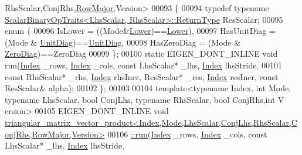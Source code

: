 \begin{DoxyCode}
      RhsScalar,ConjRhs,\hyperlink{group__enums_ggaacded1a18ae58b0f554751f6cdf9eb13acfcde9cd8677c5f7caf6bd603666aae3}{RowMajor},Version>
00093 \{
00094   \textcolor{keyword}{typedef} \textcolor{keyword}{typename} \hyperlink{group___core___module_struct_eigen_1_1_scalar_binary_op_traits}{ScalarBinaryOpTraits<LhsScalar, RhsScalar>::ReturnType}
       ResScalar;
00095   \textcolor{keyword}{enum} \{
00096     IsLower = ((Mode&\hyperlink{group__enums_gga39e3366ff5554d731e7dc8bb642f83cda891792b8ed394f7607ab16dd716f60e6}{Lower})==\hyperlink{group__enums_gga39e3366ff5554d731e7dc8bb642f83cda891792b8ed394f7607ab16dd716f60e6}{Lower}),
00097     HasUnitDiag = (Mode & \hyperlink{group__enums_gga39e3366ff5554d731e7dc8bb642f83cdaddb72f888ac85d5a1c52333e54f9374b}{UnitDiag})==\hyperlink{group__enums_gga39e3366ff5554d731e7dc8bb642f83cdaddb72f888ac85d5a1c52333e54f9374b}{UnitDiag},
00098     HasZeroDiag = (Mode & \hyperlink{group__enums_gga39e3366ff5554d731e7dc8bb642f83cda884ff7240392e85aa6e4b3c957e36483}{ZeroDiag})==ZeroDiag
00099   \};
00100   \textcolor{keyword}{static} EIGEN\_DONT\_INLINE \textcolor{keywordtype}{void} run(\hyperlink{namespace_eigen_a62e77e0933482dafde8fe197d9a2cfde}{Index} \_rows, \hyperlink{namespace_eigen_a62e77e0933482dafde8fe197d9a2cfde}{Index} \_cols, \textcolor{keyword}{const} LhsScalar* \_lhs, 
      \hyperlink{namespace_eigen_a62e77e0933482dafde8fe197d9a2cfde}{Index} lhsStride,
00101                                     \textcolor{keyword}{const} RhsScalar* \_rhs, \hyperlink{namespace_eigen_a62e77e0933482dafde8fe197d9a2cfde}{Index} rhsIncr, ResScalar* \_res, 
      \hyperlink{namespace_eigen_a62e77e0933482dafde8fe197d9a2cfde}{Index} resIncr, \textcolor{keyword}{const} ResScalar& alpha);
00102 \};
00103 
00104 \textcolor{keyword}{template}<\textcolor{keyword}{typename} Index, \textcolor{keywordtype}{int} Mode, \textcolor{keyword}{typename} LhsScalar, \textcolor{keywordtype}{bool} ConjLhs, \textcolor{keyword}{typename} RhsScalar, \textcolor{keywordtype}{bool} ConjRhs,\textcolor{keywordtype}{int} V
      ersion>
00105 EIGEN\_DONT\_INLINE \textcolor{keywordtype}{void} 
      \hyperlink{struct_eigen_1_1internal_1_1triangular__matrix__vector__product}{triangular\_matrix\_vector\_product<Index,Mode,LhsScalar,ConjLhs,RhsScalar,ConjRhs,RowMajor,Version>}
00106 \hyperlink{struct_eigen_1_1internal_1_1triangular__matrix__vector__product}{  ::run}(\hyperlink{namespace_eigen_a62e77e0933482dafde8fe197d9a2cfde}{Index} \_rows, \hyperlink{namespace_eigen_a62e77e0933482dafde8fe197d9a2cfde}{Index} \_cols, \textcolor{keyword}{const} LhsScalar* \_lhs, \hyperlink{namespace_eigen_a62e77e0933482dafde8fe197d9a2cfde}{Index} lhsStride,

\end{DoxyCode}
